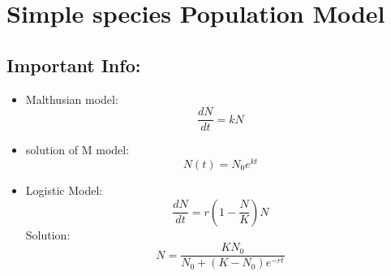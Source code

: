 \chapter{Simple species Population Model}
\section*{Important Info:}
\begin{itemize}
    \item Malthusian model:
    $$\frac{dN}{dt} = kN$$
    \item solution of M model:
    $$ N(t) = N_0 e^{kt}$$
    \item Logistic Model:
     $$\frac{dN}{dt} = r \left(1 - \frac{N}{K}\right) N $$
     Solution:
     $$ N = \frac{K N_0}{N_0 + (K - N_0) e^{-rt}}$$
\end{itemize}